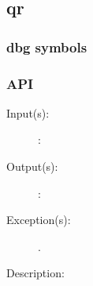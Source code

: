 %
%
%
%
%              

\subsection{qr}
\label{qr}

\subsubsection{dbg symbols}

\subsubsection{API}
\begin{description}
\label{qr_}
\item[{\cfunc[]{qr\_}{}}: ]
	\begin{description}\item[]
	\item[Input(s): ]
		\begin{description}\item[]
		\item[: ]
		\end{description}
	\item[Output(s): ]
		\begin{description}\item[]
		\item[: ]
		\end{description}
	\item[Exception(s): ]
		\begin{description}\item[]
		\item[.]
		\end{description}
	\item[Description: ]
	\end{description}
\end{description}
